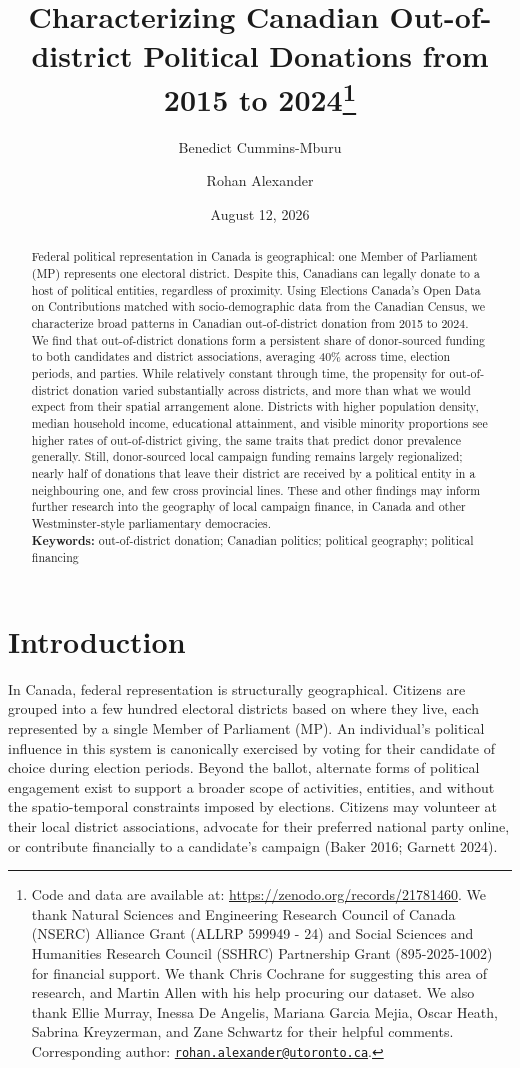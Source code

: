 \documentclass[
  letterpaper,
  DIV=11,
  numbers=noendperiod]{scrartcl}
\title{Characterizing Canadian Out-of-district Political Donations from
2015 to 2024\thanks{Code and data are available at:
\url{https://zenodo.org/records/21781460}. We thank Natural Sciences and
Engineering Research Council of Canada (NSERC) Alliance Grant (ALLRP
599949 - 24) and Social Sciences and Humanities Research Council (SSHRC)
Partnership Grant (895-2025-1002) for financial support. We thank Chris
Cochrane for suggesting this area of research, and Martin Allen with his
help procuring our dataset. We also thank Ellie Murray, Inessa De
Angelis, Mariana Garcia Mejia, Oscar Heath, Sabrina Kreyzerman, and Zane
Schwartz for their helpful comments. Corresponding author:
\href{mailto:rohan.alexander@utoronto.ca}{\nolinkurl{rohan.alexander@utoronto.ca}}.}}
\author{Benedict Cummins-Mburu \and Rohan Alexander}
\date{August 12, 2026}
\begin{document}
\maketitle
\begin{abstract}
Federal political representation in Canada is geographical: one Member
of Parliament (MP) represents one electoral district. Despite this,
Canadians can legally donate to a host of political entities, regardless
of proximity. Using Elections Canada's Open Data on Contributions
matched with socio-demographic data from the Canadian Census, we
characterize broad patterns in Canadian out-of-district donation from
2015 to 2024. We find that out-of-district donations form a persistent
share of donor-sourced funding to both candidates and district
associations, averaging 40\% across time, election periods, and parties.
While relatively constant through time, the propensity for
out-of-district donation varied substantially across districts, and more
than what we would expect from their spatial arrangement alone.
Districts with higher population density, median household income,
educational attainment, and visible minority proportions see higher
rates of out-of-district giving, the same traits that predict donor
prevalence generally. Still, donor-sourced local campaign funding
remains largely regionalized; nearly half of donations that leave their
district are received by a political entity in a neighbouring one, and
few cross provincial lines. These and other findings may inform further
research into the geography of local campaign finance, in Canada and
other Westminster-style parliamentary democracies.\\

\textbf{Keywords:} out-of-district donation; Canadian politics;
political geography; political financing
\end{abstract}


\newpage

\section{Introduction}\label{sec-intro}

In Canada, federal representation is structurally geographical. Citizens
are grouped into a few hundred electoral districts based on where they
live, each represented by a single Member of Parliament (MP). An
individual's political influence in this system is canonically exercised
by voting for their candidate of choice during election periods. Beyond
the ballot, alternate forms of political engagement exist to support a
broader scope of activities, entities, and without the spatio-temporal
constraints imposed by elections. Citizens may volunteer at their local
district associations, advocate for their preferred national party
online, or contribute financially to a candidate's campaign (Baker 2016;
Garnett 2024).
\end{document}
